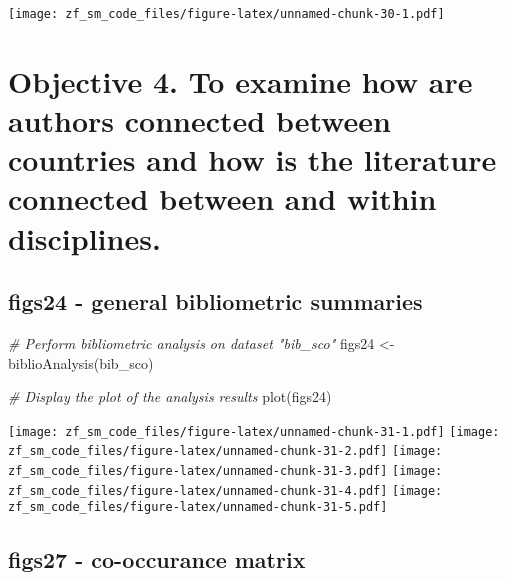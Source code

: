 \documentclass[
]{article}
\newenvironment{Shaded}{\begin{snugshade}}{\end{snugshade}}
\newcommand{\CommentTok}[1]{\textcolor[rgb]{0.56,0.35,0.01}{\textit{#1}}}
\newcommand{\FunctionTok}[1]{\textcolor[rgb]{0.00,0.00,0.00}{#1}}
\newcommand{\NormalTok}[1]{#1}
\newcommand{\OtherTok}[1]{\textcolor[rgb]{0.56,0.35,0.01}{#1}}
\begin{document}
\texttt{[image: zf\_sm\_code\_files/figure-latex/unnamed-chunk-30-1.pdf]}

\hypertarget{objective-4.-to-examine-how-are-authors-connected-between-countries-and-how-is-the-literature-connected-between-and-within-disciplines.}{%
\section{Objective 4. To examine how are authors connected between
countries and how is the literature connected between and within
disciplines.}\label{objective-4.-to-examine-how-are-authors-connected-between-countries-and-how-is-the-literature-connected-between-and-within-disciplines.}}

\hypertarget{figs24---general-bibliometric-summaries}{%
\subsection{figs24 - general bibliometric
summaries}\label{figs24---general-bibliometric-summaries}}

\begin{Shaded}
\begin{Highlighting}[]
\CommentTok{\# Perform bibliometric analysis on dataset "bib\_sco"}
\NormalTok{figs24 }\OtherTok{\textless{}{-}} \FunctionTok{biblioAnalysis}\NormalTok{(bib\_sco)}

\CommentTok{\# Display the plot of the analysis results}
\FunctionTok{plot}\NormalTok{(figs24)}
\end{Highlighting}
\end{Shaded}

\texttt{[image: zf\_sm\_code\_files/figure-latex/unnamed-chunk-31-1.pdf]}
\texttt{[image: zf\_sm\_code\_files/figure-latex/unnamed-chunk-31-2.pdf]}
\texttt{[image: zf\_sm\_code\_files/figure-latex/unnamed-chunk-31-3.pdf]}
\texttt{[image: zf\_sm\_code\_files/figure-latex/unnamed-chunk-31-4.pdf]}
\texttt{[image: zf\_sm\_code\_files/figure-latex/unnamed-chunk-31-5.pdf]}

\hypertarget{figs27---co-occurance-matrix}{%
\subsection{figs27 - co-occurance
matrix}\label{figs27---co-occurance-matrix}}
\end{document}
